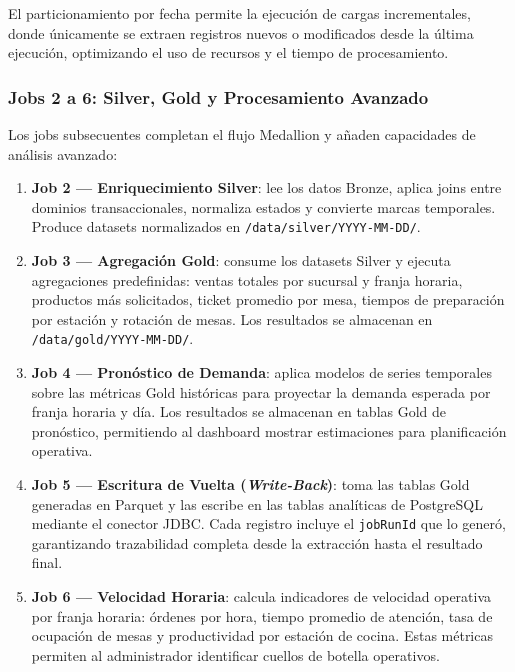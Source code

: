 El particionamiento por fecha permite la ejecución de cargas
incrementales, donde únicamente se extraen registros nuevos o
modificados desde la última ejecución, optimizando el uso de
recursos y el tiempo de procesamiento.

\subsubsection{Jobs 2 a 6: Silver, Gold y Procesamiento Avanzado}

Los jobs subsecuentes completan el flujo Medallion y añaden
capacidades de análisis avanzado:

\begin{enumerate}[leftmargin=1.5em]
  \item \textbf{Job 2 --- Enriquecimiento Silver}: lee los datos Bronze,
  aplica joins entre dominios transaccionales, normaliza estados y
  convierte marcas temporales. Produce datasets normalizados en
  \texttt{/data/silver/YYYY-MM-DD/}.

  \item \textbf{Job 3 --- Agregación Gold}: consume los datasets Silver
  y ejecuta agregaciones predefinidas: ventas totales por sucursal y
  franja horaria, productos más solicitados, ticket promedio por mesa,
  tiempos de preparación por estación y rotación de mesas. Los resultados
  se almacenan en \texttt{/data/gold/YYYY-MM-DD/}.

  \item \textbf{Job 4 --- Pronóstico de Demanda}: aplica modelos de
  series temporales sobre las métricas Gold históricas para proyectar la
  demanda esperada por franja horaria y día. Los resultados se almacenan
  en tablas Gold de pronóstico, permitiendo al dashboard mostrar
  estimaciones para planificación operativa.

  \item \textbf{Job 5 --- Escritura de Vuelta (\textit{Write-Back})}:
  toma las tablas Gold generadas en Parquet y las escribe en las tablas
  analíticas de PostgreSQL mediante el conector JDBC. Cada registro
  incluye el \texttt{jobRunId} que lo generó, garantizando trazabilidad
  completa desde la extracción hasta el resultado final.

  \item \textbf{Job 6 --- Velocidad Horaria}: calcula indicadores de
  velocidad operativa por franja horaria: órdenes por hora, tiempo
  promedio de atención, tasa de ocupación de mesas y productividad por
  estación de cocina. Estas métricas permiten al administrador
  identificar cuellos de botella operativos.
\end{enumerate}

